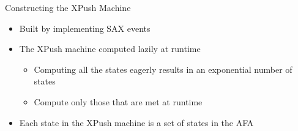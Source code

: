 \documentclass[mathserif,serif]{beamer}
\begin{document}
\begin{frame}{Constructing the XPush Machine}
  \begin{itemize}
    \item<1-> Built by implementing SAX events
      \item<2-> The XPush machine computed lazily at runtime
        \begin{itemize}
          \item Computing all the states eagerly results in an exponential number of states
          \item Compute only those that are met at runtime
        \end{itemize}
      \item<2-> Each state in the XPush machine is a set of states in the AFA
    \end{itemize}
  \end{frame}
\end{document}
